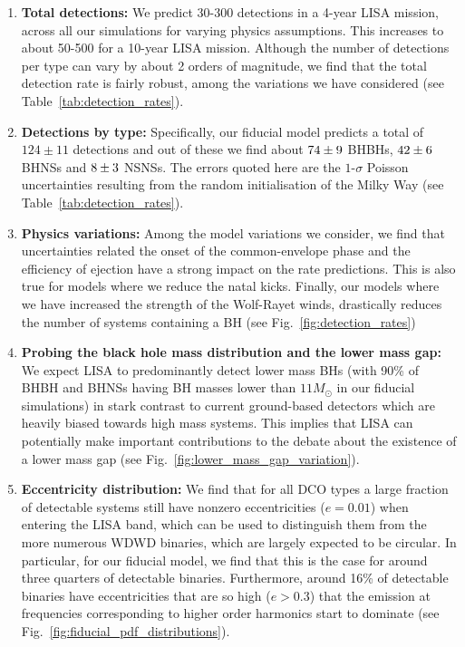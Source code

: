 \begin{enumerate}
    \item \textbf{Total detections:} We predict 30-300 detections in a 4-year LISA mission, across all our simulations for varying physics assumptions. This increases to about 50-500 for a 10-year LISA mission. Although the number of detections per type can vary by about 2 orders of magnitude, we find that the total detection rate is fairly robust, among the variations we have considered (see Table~\ref{tab:detection_rates}).
    
     \item \textbf{Detections by type:} Specifically, our fiducial model predicts a total of $124 \pm 11$ detections and out of these we find about $74{}\pm 9$ BHBHs, $42{}\pm 6$ BHNSs and $8{}\pm 3$ NSNSs. The errors quoted here are the $1$-$\sigma$ Poisson uncertainties resulting from the random initialisation of the Milky Way (see Table~\ref{tab:detection_rates}).
    
    \item \textbf{Physics variations:}  Among the model variations we consider, we find that uncertainties related the onset of the common-envelope phase and the efficiency of ejection have a strong impact on the rate predictions. This is also true for models where we reduce the natal kicks. Finally, our models where we have increased the strength of the Wolf-Rayet winds, drastically reduces the number of systems containing a BH (see Fig.~\ref{fig:detection_rates})
    
    \item \textbf{Probing the black hole mass distribution and the lower mass gap:} We expect LISA to predominantly detect lower mass BHs (with 90\% of BHBH and BHNSs having BH masses lower than $11 \unit{M_\odot}$ in our fiducial simulations) in stark contrast to current ground-based detectors which are heavily biased towards high mass systems. This implies that LISA can potentially make important contributions to the debate about the existence of a lower mass gap (see Fig.~\ref{fig:lower_mass_gap_variation}).
    
    \item \textbf{Eccentricity distribution:} We find that for all DCO types a large fraction of detectable systems still have nonzero eccentricities ($e = 0.01$) when entering the LISA band, which can be used to distinguish them from the more numerous WDWD binaries, which are largely expected to be circular. In particular, for our fiducial model, we find that this is the case for around three quarters of detectable binaries. Furthermore, around 16\% of detectable binaries have eccentricities that are so high ($e > 0.3$) that the emission at frequencies corresponding to higher order harmonics start to dominate (see Fig.~\ref{fig:fiducial_pdf_distributions}).
    

\end{enumerate}
